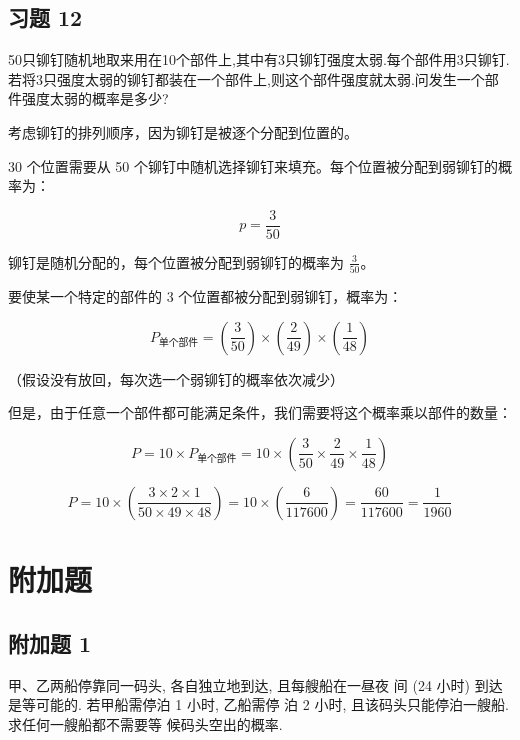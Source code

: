 \documentclass[twoside]{article}
\begin{document}
\subsection{习题 12}

50只铆钉随机地取来用在10个部件上,其中有3只铆钉强度太弱.每个部件用3只铆钉.若将3只强度太弱的铆钉都装在一个部件上,则这个部件强度就太弱.问发生一个部件强度太弱的概率是多少?

\begin{ans}{3}{3}

    考虑铆钉的排列顺序，因为铆钉是被逐个分配到位置的。

    30 个位置需要从 50 个铆钉中随机选择铆钉来填充。每个位置被分配到弱铆钉的概率为：
    
    \[
    p = \frac{3}{50}
    \]
    
    铆钉是随机分配的，每个位置被分配到弱铆钉的概率为 \(\frac{3}{50}\)。
    
    要使某一个特定的部件的 3 个位置都被分配到弱铆钉，概率为：
    
    \[
    P_{\text{单个部件}} = \left( \frac{3}{50} \right) \times \left( \frac{2}{49} \right) \times \left( \frac{1}{48} \right)
    \]
    
    （假设没有放回，每次选一个弱铆钉的概率依次减少）
    
    但是，由于任意一个部件都可能满足条件，我们需要将这个概率乘以部件的数量：
    
    \[
    P = 10 \times P_{\text{单个部件}} = 10 \times \left( \frac{3}{50} \times \frac{2}{49} \times \frac{1}{48} \right)
    \]
    
    \[
    P = 10 \times \left( \frac{3 \times 2 \times 1}{50 \times 49 \times 48} \right) = 10 \times \left( \frac{6}{117600} \right) = \frac{60}{117600} = \frac{1}{1960}
    \]
\end{ans}

\section{附加题}

\subsection{附加题 1}

甲、乙两船停靠同一码头, 各自独立地到达, 且每艘船在一昼夜
间 (24 小时) 到达是等可能的. 若甲船需停泊 1 小时, 乙船需停
泊 2 小时, 且该码头只能停泊一艘船. 求任何一艘船都不需要等
候码头空出的概率.
\end{document}
